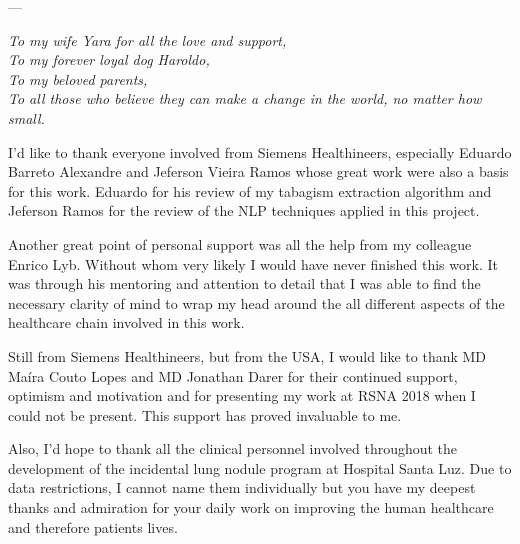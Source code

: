 \documentclass[
	12pt,				%
	openany,			%
  oneside,      %
	a4paper,			%
	brazil,			%
	french,			%
	spanish,			%
	english       %
	]{abntex2}
\newcommand{\nomeHsl}{Hospital Santa Luz}
\begin{document}

\frenchspacing 


\imprimircapa

\imprimirfolhaderosto





 ---
\begin{dedicatoria}
  \centering
  \noindent
  \textit{To my wife Yara for all the love and support,\\To my forever loyal dog Haroldo,\\To my beloved parents,\\To all those who believe they can make a change in the world, no matter how small.}
  \vspace*{\fill}
\end{dedicatoria}

\begin{agradecimentos}
  I'd like to thank everyone involved from Siemens Healthineers, especially Eduardo Barreto Alexandre and Jeferson Vieira Ramos whose great work were also a basis for this work. Eduardo for his review of my tabagism extraction algorithm and Jeferson Ramos for the review of the NLP techniques applied in this project.

  Another great point of personal support was all the help from my colleague Enrico Lyb. Without whom very likely I would have never finished this work. It was through his mentoring and attention to detail that I was able to find the necessary clarity of mind to wrap my head around the all different aspects of the healthcare chain involved in this work.

  Still from Siemens Healthineers, but from the USA, I would like to thank MD Maíra Couto Lopes and MD Jonathan Darer for their continued support, optimism and motivation and for presenting my work at RSNA 2018 when I could not be present. This support has proved invaluable to me.

  Also, I'd hope to thank all the clinical personnel involved throughout the development of the incidental lung nodule program at \nomeHsl{}. Due to data restrictions, I cannot name them individually but you have my deepest thanks and admiration for your daily work on improving the human healthcare and therefore patients lives.
\end{agradecimentos}
\end{document}
